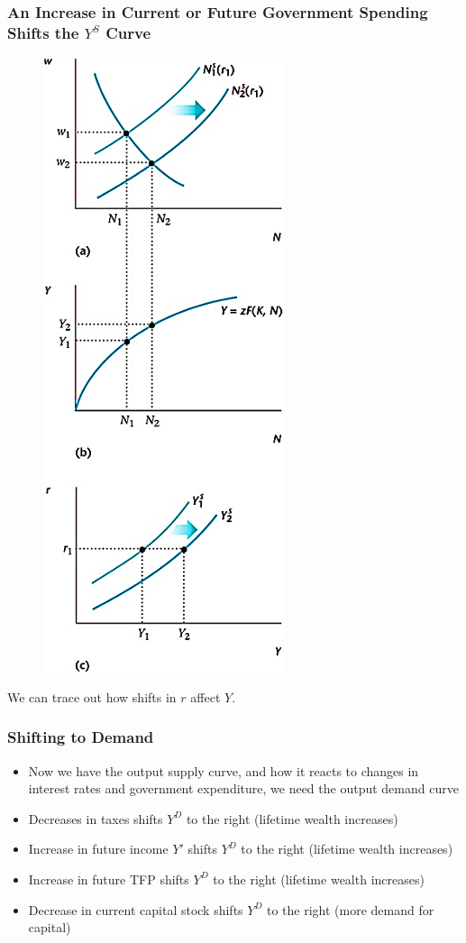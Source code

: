 \documentclass{beamer}
\begin{document}
\begin{frame}
\frametitle[alignment=center]{An Increase in Current or Future Government Spending Shifts the $Y^S$ Curve} 
\begin{figure}
\centering
\includegraphics[scale=0.62]{Figures/W_Fig_11pt16.png}
\end{figure}
We can trace out how shifts in $r$ affect $Y$.  
\end{frame}

\begin{frame}
\frametitle[alignment=center]{Shifting to Demand} 
\begin{itemize}
\item Now we have the output supply curve, and how it reacts to changes in interest rates and government expenditure, we need the output demand curve
\bigskip
\item Decreases in taxes shifts $Y^D$ to the right (lifetime wealth increases)
\bigskip
\item  Increase in future income $Y'$ shifts $Y^D$ to the right (lifetime wealth increases)
\bigskip
\item Increase in future TFP shifts $Y^D$ to the right (lifetime wealth increases)
\bigskip
\item Decrease in current capital stock shifts $Y^D$ to the right (more demand for capital)
\end{itemize}
\end{frame}
\end{document}
